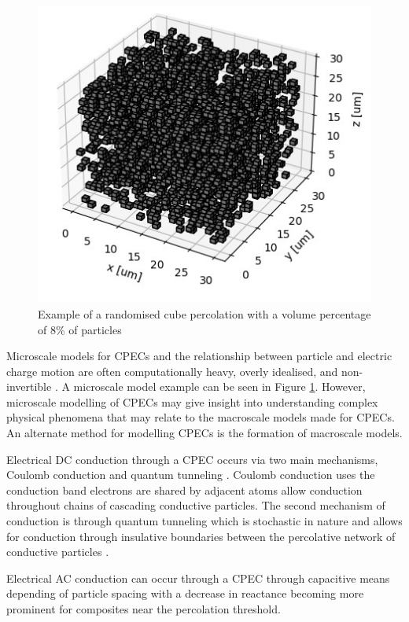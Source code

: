 
\begin{figure}[H]
    \centering
    \includegraphics[width=0.6\linewidth]{Figures/simple_random_percolation.jpg}
    \caption{Example of a randomised cube percolation with a volume percentage of 8\% of particles}
    \label{fig:simp_rand_perc}
\end{figure}

Microscale models for CPECs and the relationship between particle and electric charge motion are often computationally heavy, overly idealised, and non-invertible \cite{Wang2022}. A microscale model example can be seen in Figure \ref{fig:simp_rand_perc}. However, microscale modelling of CPECs may give insight into understanding complex physical phenomena that may relate to the macroscale models made for CPECs. An alternate method for modelling CPECs is the formation of macroscale models\cite{Neffati2019}.

Electrical DC conduction through a CPEC occurs via two main mechanisms, Coulomb conduction and quantum tunneling \cite{Bloor2006,Duan2014,Zhang2007,Madrid2017}. Coulomb conduction uses the conduction band electrons are shared by adjacent atoms allow conduction throughout chains of cascading conductive particles. The second mechanism of conduction is through quantum tunneling which is stochastic in nature and allows for conduction through insulative boundaries between the percolative network of conductive particles \cite{Hu2008,Grimaldi2006}. 

Electrical AC conduction can occur through a CPEC through capacitive means depending of particle spacing with a decrease in reactance becoming more prominent for composites near the percolation threshold\cite{HindermannBischoff2001}.

